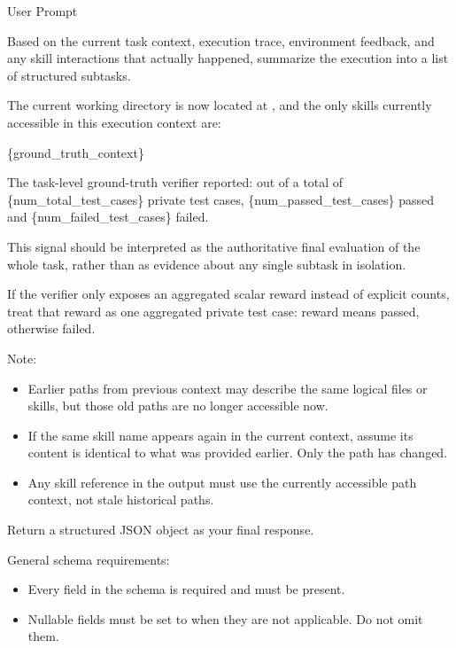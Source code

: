 \begin{svpromptbox}{User Prompt}

\smallskip
Based on the current task context, execution trace, environment feedback, and any skill interactions that actually happened, summarize the execution into a list of structured subtasks.\par
\smallskip
{}
\smallskip
The current working directory is now located at , and the only skills currently accessible in this execution context are:\par
{}\par
\smallskip
\{ground\_truth\_context\}\par
\smallskip
The task-level ground-truth verifier reported: out of a total of \{num\_total\_test\_cases\} private test cases, \{num\_passed\_test\_cases\} passed and \{num\_failed\_test\_cases\} failed.\par
\smallskip
This signal should be interpreted as the authoritative final evaluation of the whole task, rather than as evidence about any single subtask in isolation.\par
If the verifier only exposes an aggregated scalar reward instead of explicit counts, treat that reward as one aggregated private test case: reward  means passed, otherwise failed.\par
\smallskip
Note:\par
\smallskip
\begin{itemize}
\item Earlier paths from previous context may describe the same logical files or skills, but those old paths are no longer accessible now.
\item If the same skill name appears again in the current context, assume its content is identical to what was provided earlier. Only the path has changed.
\item Any skill reference in the output must use the currently accessible path context, not stale historical paths.
\end{itemize}
\smallskip
{}
\smallskip
Return a structured JSON object as your final response.\par
\smallskip
General schema requirements:\par
\smallskip
\begin{itemize}
\item Every field in the schema is required and must be present.
\item Nullable fields must be set to  when they are not applicable. Do not omit them.

\end{itemize}
\end{svpromptbox}
